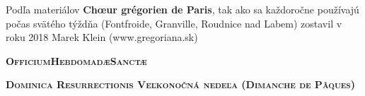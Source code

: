 
\def \feria {A}
\def \feriashort {b}
\def \ohschaptername {c}
\let\feriashort\relax
\let\feria\relax
\clearpage
{}
\begin{center}
Podľa materiálov \textbf{Chœur grégorien de Paris}, 
\linebreak tak ako sa každoročne používajú počas svätého týždňa
\linebreak (Fontfroide, Granville, Roudnice nad Labem)
\linebreak zostavil v roku 2018 Marek Klein (www.gregoriana.sk)
\end{center}
\thispagestyle{empty}
\clearpage
\begin{center}\huge{\textbf{\textsc{Officium\linebreak Hebdomadæ\linebreak Sanctæ}}}\end{center}

\begin{center}\large{\textbf{\textsc{
Dominica Resurrectionis\linebreak
Veľkonočná nedeľa\linebreak
(Dimanche de Pâques)
}}}\end{center}
\thispagestyle{empty}
\newpage{}



